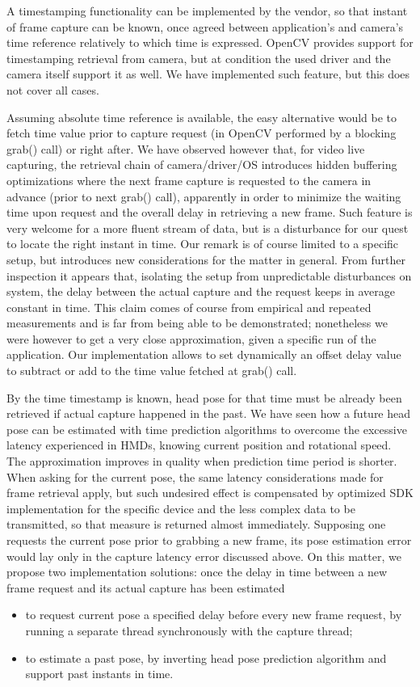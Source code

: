 A timestamping functionality can be implemented by the vendor, so that instant of frame capture can be known, once agreed between application's and camera's time reference relatively to which time is expressed. OpenCV provides support for timestamping retrieval from camera, but at condition the used driver and the camera itself support it as well. We have implemented such feature, but this does not cover all cases.

Assuming absolute time reference is available, the easy alternative would be to fetch time value prior to capture request (in OpenCV performed by a blocking grab() call) or right after. We have observed however that, for video live capturing, the retrieval chain of camera/driver/OS introduces hidden buffering optimizations where the next frame capture is requested to the camera in advance (prior to next grab() call), apparently in order to minimize the waiting time upon request and the overall delay in retrieving a new frame. Such feature is very welcome for a more fluent stream of data, but is a disturbance for our quest to locate the right instant in time. Our remark is of course limited to a specific setup, but introduces new considerations for the matter in general. From further inspection it appears that, isolating the setup from unpredictable disturbances on system, the delay between the actual capture and the request keeps in average constant in time. This claim comes of course from empirical and repeated measurements and is far from being able to be demonstrated; nonetheless we were however to get a very close approximation, given a specific run of the application. Our implementation allows to set dynamically an offset delay value to subtract or add to the time value fetched at grab() call.

By the time timestamp is known, head pose for that time must be already been retrieved if actual capture happened in the past. We have seen how a future head pose can be estimated with time prediction algorithms to overcome the excessive latency experienced in HMDs, knowing current position and rotational speed. The approximation improves in quality when prediction time period is shorter. When asking for the current pose, the same latency considerations made for frame retrieval apply, but such undesired effect is compensated by optimized SDK implementation for the specific device and the less complex data to be transmitted, so that measure is returned almost immediately. Supposing one requests the current pose prior to grabbing a new frame, its pose estimation error would lay only in the capture latency error discussed above. On this matter, we propose two implementation solutions: once the delay in time between a new frame request and its actual capture has been estimated
\begin{itemize}
\item to request current pose a specified delay before every new frame request, by running a separate thread synchronously with the capture thread;
\item to estimate a past pose, by inverting head pose prediction algorithm and support past instants in time.
\end{itemize}

